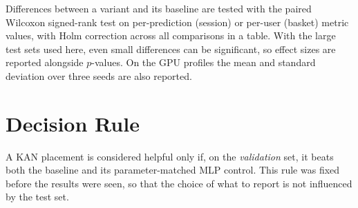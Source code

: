 Differences between a variant and its baseline are tested with the paired
Wilcoxon signed-rank test on per-prediction (session) or per-user (basket)
metric values, with Holm correction across all comparisons in a table. With the
large test sets used here, even small differences can be significant, so effect
sizes are reported alongside $p$-values. On the GPU profiles the mean and
standard deviation over three seeds are also reported.

\section{Decision Rule}

A KAN placement is considered helpful only if, on the \emph{validation} set, it
beats both the baseline and its parameter-matched MLP control. This rule was
fixed before the results were seen, so that the choice of what to report is not
influenced by the test set.
